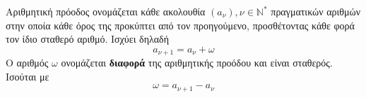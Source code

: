 Αριθμητική πρόοδος ονομάζεται κάθε ακολουθία $ (a_\nu),\nu\in\mathbb{N}^* $ πραγματικών αριθμών στην οποία κάθε όρος της προκύπτει από τον προηγούμενο, προσθέτοντας κάθε φορά τον ίδιο σταθερό αριθμό. Ισχύει δηλαδή
\[ a_{\nu+1}=a_\nu+\omega \]
Ο αριθμός $ \omega $ ονομάζεται \textbf{διαφορά} της αριθμητικής προόδου και είναι σταθερός. Ισούται με 
\[ \omega=a_{\nu+1}-a_\nu  \]
